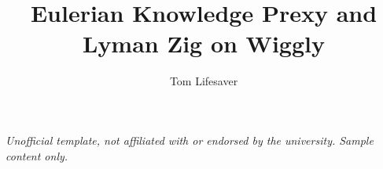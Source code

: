 \documentclass{ucbthesis}
\begin{document}

\title{Eulerian Knowledge Prexy and Lyman Zig on Wiggly}
\author{Tom Lifesaver}


\maketitle
\thispagestyle{empty}\begin{center}{\footnotesize\itshape Unofficial template, not affiliated with or endorsed by the university. Sample content only.\par}\end{center}
\approvalpage
\copyrightpage


\end{document}
